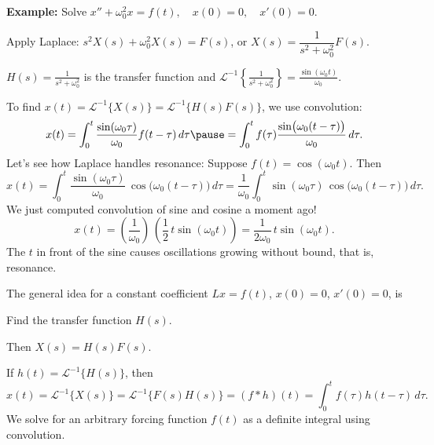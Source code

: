 \documentclass[10pt,aspectratio=169]{beamer}
\begin{document}
\begin{frame}
\textbf{Example:}
Solve \quad 
$x'' + \omega_0^2 x = f(t) , \quad x(0) = 0, \quad x'(0) = 0$.

\medskip
\pause

Apply Laplace: \quad
$s^2 X(s) + \omega_0^2 X(s) = F(s)$,
\pause
\quad
or
\quad
$X(s) = \dfrac{1}{s^2+ \omega_0^2} F(s)$.

\medskip
\pause

$H(s) = \frac{1}{s^2+ \omega_0^2}$ is the transfer function
and
$
{\mathcal{L}}^{-1} \left\{
\frac{1}{s^2+ \omega_0^2}
\right\} = 
\frac{\sin (\omega_0 t)}{\omega_0}$.

\medskip
\pause

To find $
x(t) = 
{\mathcal{L}}^{-1} \bigl\{
X(s)
\bigr\}
=
{\mathcal{L}}^{-1} \bigl\{
H(s) F(s)
\bigr\}$, we use convolution:
\[
x(t) = 
\int_0^t
\frac{\sin (\omega_0 \tau)}{\omega_0}
f(t-\tau) \, d\tau 
\pause
=
\int_0^t
f(\tau) 
\frac{\sin \bigl( \omega_0 (t-\tau) \bigr)}{\omega_0} \, d\tau .
\]
\pause
Let's see how Laplace handles resonance:
\quad
Suppose $f(t) =
\cos (\omega_0 t)$.
\pause\quad
Then
\[
x(t) = 
\int_0^t
\frac{\sin (\omega_0 \tau)}{\omega_0} \,
\cos \bigl( \omega_0 (t-\tau) \bigr) \, d\tau
=
\frac{1}{\omega_0}
\int_0^t
\sin ( \omega_0 \tau ) \,
\cos \bigl(\omega_0 (t-\tau) \bigr) \, d\tau .
\]
\pause
We just computed convolution of sine and cosine a moment ago!
\[
x(t) =
\left(
\frac{1}{\omega_0}
\right) \,
\left(
\frac{1}{2} \,
t
\sin ( \omega_0 t )
\right)
=
\frac{1}{2 \omega_0} \,
t
\sin ( \omega_0 t ).
\]
\pause
The $t$ in front of the sine causes oscillations growing without
bound, that is, resonance.

\end{frame}

\begin{frame}
The general idea for a constant coefficient
\quad $Lx = f(t)$, \quad $x(0)=0$, \quad $x'(0)=0$, \quad
is

\medskip
\pause

Find the transfer function $H(s)$.

\medskip
\pause

Then $X(s) = H(s)F(s)$.

\medskip
\pause

If
$h(t) = {\mathcal{L}}^{-1}\bigl\{ H(s) \bigr\}$, then
\[
x(t)
= {\mathcal{L}}^{-1}\bigl\{ X(s) \bigr\}
= {\mathcal{L}}^{-1}\bigl\{ F(s)H(s) \bigr\}
= (f * h)(t)
= \int_0^t f(\tau) h(t-\tau) \, d\tau .
\]
\pause
We solve for an arbitrary 
forcing function $f(t)$ as a definite integral using convolution.

\end{frame}
\end{document}
